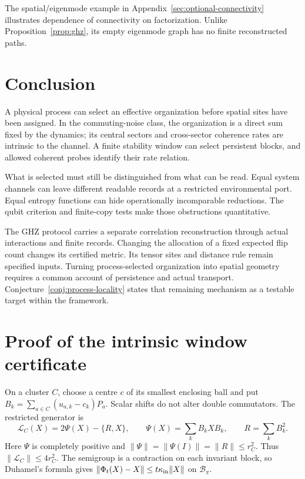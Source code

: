 \documentclass[12pt,a4paper]{article}
\begin{document}
The spatial/eigenmode example in Appendix~\ref{sec:optional-connectivity}
illustrates dependence of connectivity on factorization. Unlike
Proposition~\ref{prop:ghz}, its empty eigenmode graph has no finite
reconstructed paths.

\section{Conclusion}
\label{sec:conclusion}

A physical process can select an effective organization before
spatial sites have been assigned. In the commuting-noise class,
the organization is a direct sum fixed by the dynamics; its
central sectors and cross-sector coherence rates are intrinsic to
the channel. A finite stability window can select persistent blocks,
and allowed coherent probes identify their rate relation.

What is selected must still be distinguished from what can be
read. Equal system channels can leave different readable records
at a restricted environmental port. Equal entropy functions can
hide operationally incomparable reductions. The qubit criterion
and finite-copy tests make those obstructions quantitative.

The GHZ protocol carries a separate correlation reconstruction
through actual interactions and finite records. Changing the
allocation of a fixed expected flip count changes its certified
metric. Its tensor sites and distance rule remain specified
inputs. Turning process-selected organization into spatial
geometry requires a common account of persistence and actual
transport. Conjecture~\ref{conj:process-locality} states that
remaining mechanism as a testable target within the framework.

\appendix

\section{Proof of the intrinsic window certificate}
\label{app:window-proof}

On a cluster $C$, choose a centre $c$ of its smallest enclosing
ball and put
$B_k=\sum_{a\in C}(u_{a,k}-c_k)P_a$. Scalar shifts do not alter
double commutators. The restricted generator is
\[
 \mathcal L_C(X)=2\Psi(X)-\{R,X\},\qquad
 \Psi(X)=\sum_kB_kXB_k,\qquad R=\sum_kB_k^2 .
\]
Here $\Psi$ is completely positive and
$\|\Psi\|=\|\Psi(I)\|=\|R\|\le r_C^2$.
Thus $\|\mathcal L_C\|\le4r_C^2$. The semigroup is a contraction
on each invariant block, so Duhamel's formula gives
$\|\Phi_t(X)-X\|\le t\kappa_{\rm in}\|X\|$
on $\mathcal B_\pi$.
\end{document}
